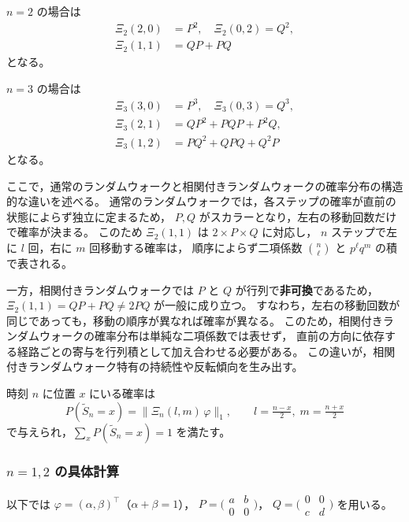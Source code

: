 \documentclass[a4j,dvipdfmx]{jsarticle}
\theoremstyle{plainnote}
\begin{document}
$n = 2$ の場合は
\begin{align*}
  \Xi_2(2,0) &= P^2, \quad \Xi_2(0,2) = Q^2, \\
  \Xi_2(1,1) &= QP + PQ
\end{align*}
となる。

$n = 3$ の場合は
\begin{align*}
  \Xi_3(3,0) &= P^3, \quad \Xi_3(0,3) = Q^3, \\
  \Xi_3(2,1) &= QP^2 + PQP + P^2Q, \\
  \Xi_3(1,2) &= PQ^2 + QPQ + Q^2P
\end{align*}
となる。

ここで，通常のランダムウォークと相関付きランダムウォークの確率分布の構造的な違いを述べる。
通常のランダムウォークでは，各ステップの確率が直前の状態によらず独立に定まるため，
$P, Q$ がスカラーとなり，左右の移動回数だけで確率が決まる。
このため $\Xi_2(1,1)$ は $2 \times P \times Q$ に対応し，
$n$ ステップで左に $l$ 回，右に $m$ 回移動する確率は，
順序によらず二項係数 $\binom{n}{\ell}$ と $p^\ell q^m$ の積で表される。

一方，相関付きランダムウォークでは $P$ と $Q$ が行列で\textbf{非可換}であるため，
$\Xi_2(1,1) = QP + PQ \neq 2PQ$ が一般に成り立つ。
すなわち，左右の移動回数が同じであっても，移動の順序が異なれば確率が異なる。
このため，相関付きランダムウォークの確率分布は単純な二項係数では表せず，
直前の方向に依存する経路ごとの寄与を行列積として加え合わせる必要がある。
この違いが，相関付きランダムウォーク特有の持続性や反転傾向を生み出す。

時刻 $n$ に位置 $x$ にいる確率は
\begin{equation}
  P(\tilde{S}_n = x) = \|\Xi_n(l,m)\,\varphi\|_1,
  \qquad l = \tfrac{n-x}{2},\; m = \tfrac{n+x}{2}
  \label{eq:crw_Xi}
\end{equation}
で与えられ，$\displaystyle\sum_{x} P(\tilde{S}_n = x) = 1$ を満たす。

\subsubsection*{$n = 1, 2$ の具体計算}

以下では $\varphi = (\alpha, \beta)^\top$（$\alpha + \beta = 1$），
$P = \bigl(\begin{smallmatrix}a&b\\0&0\end{smallmatrix}\bigr)$，
$Q = \bigl(\begin{smallmatrix}0&0\\c&d\end{smallmatrix}\bigr)$ を用いる。
\end{document}
